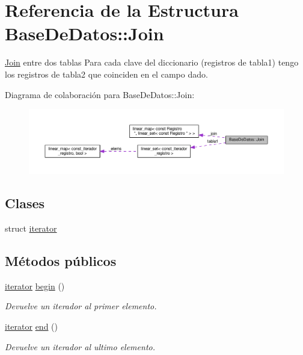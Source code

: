 \hypertarget{structBaseDeDatos_1_1Join}{\section{Referencia de la Estructura Base\-De\-Datos\-:\-:Join}
\label{structBaseDeDatos_1_1Join}
}


\hyperlink{structBaseDeDatos_1_1Join}{Join} entre dos tablas Para cada clave del diccionario (registros de tabla1) tengo los registros de tabla2 que coinciden en el campo dado.  




Diagrama de colaboración para Base\-De\-Datos\-:\-:Join\-:
\nopagebreak
\begin{figure}[H]
\begin{center}
\leavevmode
\includegraphics[width=350pt]{structBaseDeDatos_1_1Join__coll__graph}
\end{center}
\end{figure}
\subsection*{Clases}
\begin{DoxyCompactItemize}
\item 
struct \hyperlink{structBaseDeDatos_1_1Join_1_1iterator}{iterator}
\end{DoxyCompactItemize}
\subsection*{Métodos públicos}
\begin{DoxyCompactItemize}
\item 
\hypertarget{structBaseDeDatos_1_1Join_a21a90ab59b29952f615a3d793c103a73}{\hyperlink{structBaseDeDatos_1_1Join_1_1iterator}{iterator} \hyperlink{structBaseDeDatos_1_1Join_a21a90ab59b29952f615a3d793c103a73}{begin} ()}\label{structBaseDeDatos_1_1Join_a21a90ab59b29952f615a3d793c103a73}

\begin{DoxyCompactList}\small\item\em Devuelve un iterador al primer elemento. \end{DoxyCompactList}\item 
\hypertarget{structBaseDeDatos_1_1Join_adc880cc8af0728b926d2f1ff7db8443c}{\hyperlink{structBaseDeDatos_1_1Join_1_1iterator}{iterator} \hyperlink{structBaseDeDatos_1_1Join_adc880cc8af0728b926d2f1ff7db8443c}{end} ()}\label{structBaseDeDatos_1_1Join_adc880cc8af0728b926d2f1ff7db8443c}

\begin{DoxyCompactList}\small\item\em Devuelve un iterador al ultimo elemento. \end{DoxyCompactList}\end{DoxyCompactItemize}
